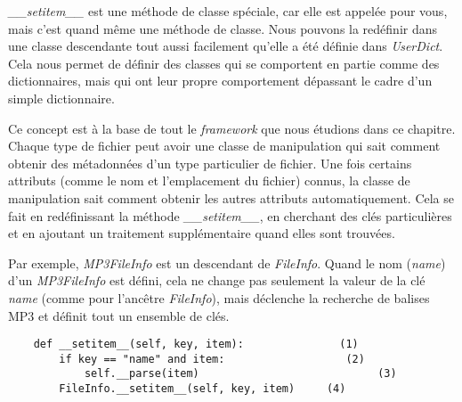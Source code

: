 \medskip
\emph{\_\_setitem\_\_} est une méthode de classe spéciale, car elle est appelée pour vous, mais c'est quand même une méthode de classe. Nous pouvons la redéfinir dans une classe descendante tout aussi facilement qu'elle a été définie dans \emph{UserDict}. Cela nous permet de définir des classes qui se comportent en partie comme des dictionnaires, mais qui ont leur propre comportement dépassant le cadre d'un simple dictionnaire.

Ce concept est à la base de tout le \emph{framework} que nous étudions dans ce chapitre. Chaque type de fichier peut avoir une classe de manipulation qui sait comment obtenir des métadonnées d'un type particulier de fichier. Une fois certains attributs (comme le nom et l'emplacement du fichier) connus, la classe de manipulation sait comment obtenir les autres attributs automatiquement. Cela se fait en redéfinissant la méthode \emph{\_\_setitem\_\_}, en cherchant des clés particulières et en ajoutant un traitement supplémentaire quand elles sont trouvées.

Par exemple, \emph{MP3FileInfo} est un descendant de \emph{FileInfo}. Quand le nom (\emph{name}) d'un \emph{MP3FileInfo} est défini, cela ne change pas seulement la valeur de la clé \emph{name} (comme pour l'ancêtre \emph{FileInfo}), mais déclenche la recherche de balises MP3 et définit tout un ensemble de clés.

\begin{example}
\begin{lstlisting}
    def __setitem__(self, key, item):               (1)
        if key == "name" and item:                   (2)
            self.__parse(item)                            (3)
        FileInfo.__setitem__(self, key, item)     (4)
\end{lstlisting}
\end{example}

